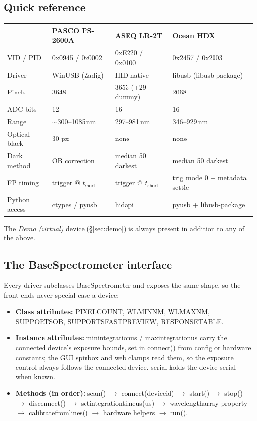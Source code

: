 \documentclass[12pt,a4paper]{article}
\DeclareRobustCommand{\code}[1]{{\ttfamily\small\def\_{\rawus\allowbreak}#1}}
\newcommand{\nm}{\,nm}
\begin{document}
\subsection{Quick reference}
\begin{longtable}{@{}p{3.0cm}p{3.3cm}p{3.3cm}p{3.4cm}@{}}
\toprule
& \textbf{PASCO PS-2600A} & \textbf{ASEQ LR-2T} & \textbf{Ocean HDX}\\
\midrule\endhead
VID / PID & 0x0945 / 0x0002 & 0xE220 / 0x0100 & 0x2457 / 0x2003\\
Driver    & WinUSB (Zadig)  & HID native      & libusb (libusb-package)\\
Pixels    & 3648            & 3653 (+29 dummy) & 2068\\
ADC bits  & 12              & 16              & 16\\
Range     & $\sim$300--1085\nm & 297--981\nm  & 346--929\nm\\
Optical black & 30 px       & none            & none\\
Dark method & OB correction & median 50 darkest & median 50 darkest\\
FP timing & trigger @ $t_{\text{short}}$ & trigger @ $t_{\text{short}}$ & trig mode 0 + metadata settle\\
Python access & ctypes / pyusb & hidapi       & pyusb + libusb-package\\
\bottomrule
\end{longtable}
The \emph{Demo (virtual)} device (\S\ref{sec:demo}) is always present in addition
to any of the above.

\subsection{The \code{BaseSpectrometer} interface}
Every driver subclasses \code{BaseSpectrometer} and exposes the same shape, so the
front-ends never special-case a device:
\begin{itemize}
  \item \textbf{Class attributes:} \code{PIXEL\_COUNT}, \code{WL\_MIN\_NM},
        \code{WL\_MAX\_NM}, \code{SUPPORTS\_OB}, \code{SUPPORTS\_FAST\_PREVIEW},
        \code{RESPONSE\_TABLE}.
  \item \textbf{Instance attributes:} \code{min\_integration\_us} /
        \code{max\_integration\_us} carry the connected device's exposure bounds,
        set in \code{connect()} from config or hardware constants; the GUI spinbox
        and web clamps read them, so the exposure control always follows the
        connected device. \code{serial} holds the device serial when known.
  \item \textbf{Methods (in order):} \code{scan()} $\to$ \code{connect(device\_id)}
        $\to$ \code{start()} $\to$ \code{stop()} $\to$ \code{disconnect()} $\to$
        \code{set\_integration\_time\_us(us)} $\to$ \code{wavelength\_array}
        property $\to$ \code{calibrate\_from\_lines()} $\to$ hardware helpers $\to$
        \code{\_run()}.
\end{itemize}
\end{document}
